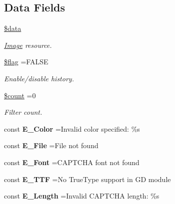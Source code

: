 \subsection*{Data Fields}
\begin{DoxyCompactItemize}
\item 
\hypertarget{class_image_a6efc15b5a2314dd4b5aaa556a375c6d6}{}\label{class_image_a6efc15b5a2314dd4b5aaa556a375c6d6} 
\hyperlink{class_image_a6efc15b5a2314dd4b5aaa556a375c6d6}{\$data}
\begin{DoxyCompactList}\small\item\em \hyperlink{class_image}{Image} resource. \end{DoxyCompactList}\item 
\hypertarget{class_image_acf5d6dd3ee125abb9a2523b30bc47d02}{}\label{class_image_acf5d6dd3ee125abb9a2523b30bc47d02} 
\hyperlink{class_image_acf5d6dd3ee125abb9a2523b30bc47d02}{\$flag} =F\+A\+L\+SE
\begin{DoxyCompactList}\small\item\em Enable/disable history. \end{DoxyCompactList}\item 
\hypertarget{class_image_af789423037bbc89dc7c850e761177570}{}\label{class_image_af789423037bbc89dc7c850e761177570} 
\hyperlink{class_image_af789423037bbc89dc7c850e761177570}{\$count} =0
\begin{DoxyCompactList}\small\item\em Filter count. \end{DoxyCompactList}\end{DoxyCompactItemize}
{\bf }\par
\begin{DoxyCompactItemize}
\item 
\hypertarget{class_image_adfd85288bc26eee86aab0d233a2015e9}{}\label{class_image_adfd85288bc26eee86aab0d233a2015e9} 
const {\bfseries E\+\_\+\+Color} =\textquotesingle{}Invalid color specified\+: \%s\textquotesingle{}
\item 
\hypertarget{class_image_ae0c1bddb66851a1c5d4984cf458a005f}{}\label{class_image_ae0c1bddb66851a1c5d4984cf458a005f} 
const {\bfseries E\+\_\+\+File} =\textquotesingle{}File not found\textquotesingle{}
\item 
\hypertarget{class_image_acd0bd9a1f20fc7514da5cdfac2915be4}{}\label{class_image_acd0bd9a1f20fc7514da5cdfac2915be4} 
const {\bfseries E\+\_\+\+Font} =\textquotesingle{}C\+A\+P\+T\+C\+HA font not found\textquotesingle{}
\item 
\hypertarget{class_image_a44c38043df185dc80b11a79ce277812c}{}\label{class_image_a44c38043df185dc80b11a79ce277812c} 
const {\bfseries E\+\_\+\+T\+TF} =\textquotesingle{}No True\+Type support in GD module\textquotesingle{}
\item 
\hypertarget{class_image_a7b6dc599dc1deedc879b3513186f3ccf}{}\label{class_image_a7b6dc599dc1deedc879b3513186f3ccf} 
const {\bfseries E\+\_\+\+Length} =\textquotesingle{}Invalid C\+A\+P\+T\+C\+HA length\+: \%s\textquotesingle{}
\end{DoxyCompactItemize}

